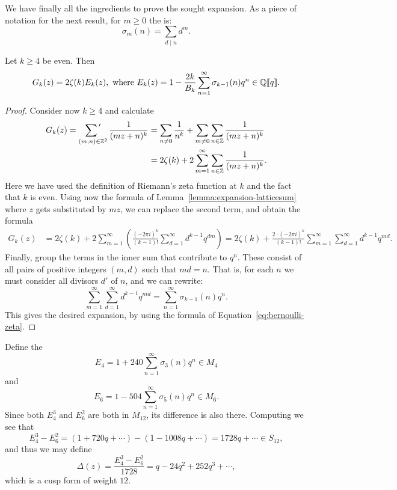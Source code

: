 We have finally all the ingredients to prove the sought expansion. As a piece of notation for the next result, for $m\geq 0$ the  is:
\[
\sigma_{m}(n)=\sum_{d\mid n} d^{m}.
\]
\begin{theorem}
  Let $k\geq 4$ be even. Then
\[
G_k(z) = 2\zeta(k) E_k(z), \text{ where } E_k(z) = 1-\frac{2k}{B_k}\sum_{n=1}^\infty \sigma_{k-1}(n)q^n\in\mathbb{Q}[\hspace{-1.5pt}[ q]\hspace{-1.5pt}].
\]
\end{theorem}
\begin{proof}
  Consider now $k\geq 4$ and calculate
\begin{align*}
G_k(z)=\sumprime_{(m,n)\in\ZZ^2} \frac{1}{(mz+n)^k} &= \sum_{n\neq 0} \frac{1}{n^k} + \sum_{m\neq 0}\sum_{n\in\ZZ} \frac{1}{(mz+n)^k}\\
&=2\zeta(k) + 2\sum_{m=1}^\infty \sum_{n\in\ZZ}\frac{1}{(mz+n)^k}.
\end{align*}
Here we have used the definition of Riemann's zeta function at $k$ and the fact that $k$ is even. Using now the formula of Lemma~\ref{lemma:expansion-latticesum} where $z$ gets substituted by $mz$, we can replace the second term, and obtain the formula
\begin{align*}
G_k(z) &= 2\zeta(k)+2\sum_{m=1}^\infty\left( \frac{(-2\pi i)^k}{(k-1)!}\sum_{d=1}^\infty d^{k-1} q^{dm}\right) = 2\zeta(k) + \frac{2\cdot (-2\pi i)^k}{(k-1)!} \sum_{m=1}^\infty\sum_{d=1}^\infty d^{k-1}q^{md}.
\end{align*}
Finally, group the terms in the inner sum that contribute to $q^n$. These consist of all pairs of positive integers $(m,d)$ such that $md=n$. That is, for each $n$ we must consider all divisors $d'$ of $n$, and we can rewrite:
\[
\sum_{m=1}^\infty\sum_{d=1}^\infty d^{k-1} q^{md} = \sum_{n=1}^\infty \sigma_{k-1}(n)q^n.
\]
This gives the desired expansion, by using the formula of Equation~\eqref{eq:bernoulli-zeta}.
\end{proof}
\begin{example}
Define the 
\[
E_4 = 1 + 240\sum_{n=1}^\infty \sigma_3(n)q^n\in M_4
\]
and
\[
E_6 = 1 - 504\sum_{n=1}^\infty \sigma_5(n)q^n\in M_6.
\]
Since both $E_4^3$ and $E_6^2$ are both in $M_{12}$, its difference is also there. Computing we see that
\[
E_4^3-E_6^2 = (1+720q+\cdots)-(1-1008q+\cdots) = 1728q+\cdots\in S_{12},
\]
and thus we may define
\[
\Delta(z)=\frac{E_4^3-E_6^2}{1728} = q-24q^2+252q^3+\cdots,
\]
which is a cusp form of weight $12$.
\end{example}

